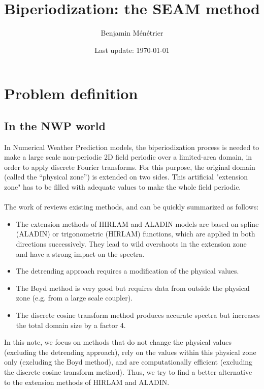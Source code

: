 \documentclass[12pt]{scrartcl}
\begin{document}
\title{Biperiodization: the SEAM method}
\author{Benjamin Ménétrier}
\date{Last update: \today}

\thispagestyle{empty}

\maketitle

\tableofcontents

\section{Problem definition}

\subsection{In the NWP world}

In Numerical Weather Prediction models, the biperiodization process is needed to make a large scale non-periodic 2D field periodic over a limited-area domain, in order to apply discrete Fourier transforms. For this purpose, the original domain (called the ``physical zone'') is extended on two sides. This artificial "extension zone" has to be filled with adequate values to make the whole field periodic.\\
$  $\\
The work of \cite{blazica_2015} reviews existing methods, and can be quickly summarized as follows:
\begin{itemize}
\item The extension methods of HIRLAM and ALADIN models are based on spline (ALADIN) or trigonometric (HIRLAM) functions, which are applied in both directions successively. They lead to wild overshoots in the extension zone and have a strong impact on the spectra.
\item The detrending approach requires a modification of the physical values.
\item The Boyd method is very good but requires data from outside the physical zone (e.g. from a large scale coupler).
\item The discrete cosine transform method produces accurate spectra but increases the total domain size by a factor 4.
\end{itemize}

In this note, we focus on methods that do not change the physical values (excluding the detrending approach), rely on the values within this physical zone only (excluding the Boyd method), and are computationally efficient (excluding the discrete cosine transform method). Thus, we try to find a better alternative to the extension methods of HIRLAM and ALADIN.
\end{document}
